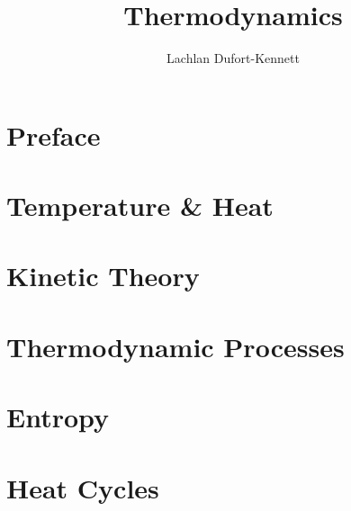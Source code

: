 \documentclass{lecture-notes}
\title{Thermodynamics}
\author{Lachlan Dufort-Kennett}
\begin{document}
    \frontmatter
    \maketitle
    \tableofcontents

    \chapter{Preface}

    \mainmatter
    \chapter{Temperature \& Heat}
    
    \chapter{Kinetic Theory}
    
    \chapter{Thermodynamic Processes}
    
    \chapter{Entropy}
    
    \chapter{Heat Cycles}
    

    \backmatter
    \nocite{*}
    
    
\end{document}
